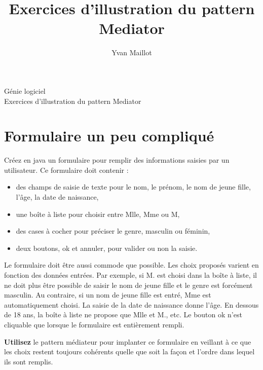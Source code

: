 \documentclass[12pt,a4paper]{article}
\author{Yvan Maillot}
\title{Exercices d'illustration du \og pattern Mediator \fg{}}
\begin{document}

\begin{center}
	\Large{G\'enie logiciel\\Exercices d'illustration du \og pattern Mediator \fg{}}
\end{center}

\section{Formulaire un peu compliqu\'e}


Créez en java un formulaire pour remplir des informations saisies par un utilisateur. Ce formulaire doit contenir :

\medskip

\begin{itemize}
\item des champs de saisie de texte pour le nom, le prénom, le nom de jeune fille, l'âge, la date de naissance,
\item une boîte à liste pour choisir entre Mlle, Mme ou M,
\item des cases à cocher pour préciser le genre, masculin ou féminin,
\item deux boutons, ok et annuler, pour valider ou non la saisie.
\end{itemize}

\medskip

Le formulaire doit être aussi commode que possible. Les choix proposés varient en fonction des données entrées. Par exemple, si M. est choisi dans la boîte à liste, il ne doit plus être possible de saisir le nom de jeune fille et le genre est forcément masculin. Au contraire, si un nom de jeune fille est entré, Mme est automatiquement choisi. La saisie de la date de naissance donne l'âge. En dessous de 18 ans, la boîte à liste ne propose que Mlle et M., etc. Le bouton ok n'est cliquable que lorsque le formulaire est entièrement rempli.

\medskip

\textbf{Utilisez} le pattern médiateur pour implanter ce formulaire en veillant à ce que les choix restent toujours cohérents quelle que soit la façon et l'ordre dans lequel ils sont remplis.
\end{document}
